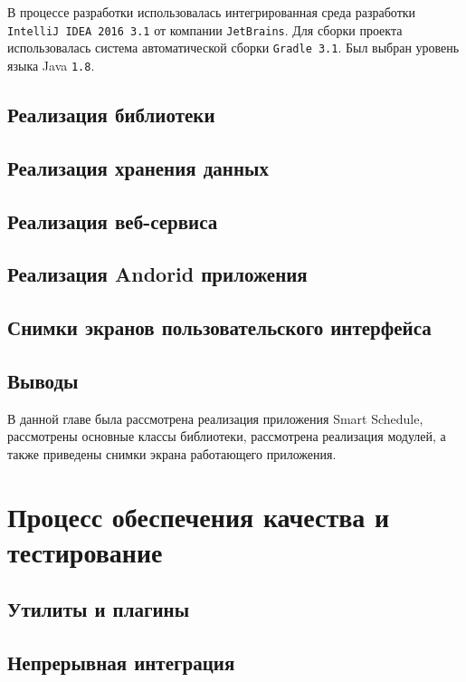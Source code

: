 В процессе разработки использовалась интегрированная среда разработки \texttt{IntelliJ IDEA 2016 3.1} от компании \texttt{JetBrains}. Для сборки проекта использовалась система автоматической сборки \texttt{Gradle 3.1}. Был выбран уровень языка Java \texttt{1.8}.

\subsection{Реализация библиотеки}

\subsection{Реализация хранения данных}

\subsection{Реализация веб-сервиса}

\subsection{Реализация Andorid приложения} 

\subsection{Снимки экранов пользовательского интерфейса}

\subsection{Выводы}

В данной главе была рассмотрена реализация приложения Smart Schedule, рассмотрены основные классы библиотеки, рассмотрена реализация модулей, а также приведены снимки экрана работающего приложения.

\section{Процесс обеспечения качества и тестирование}

\subsection{Утилиты и плагины}

\subsection{Непрерывная интеграция}

